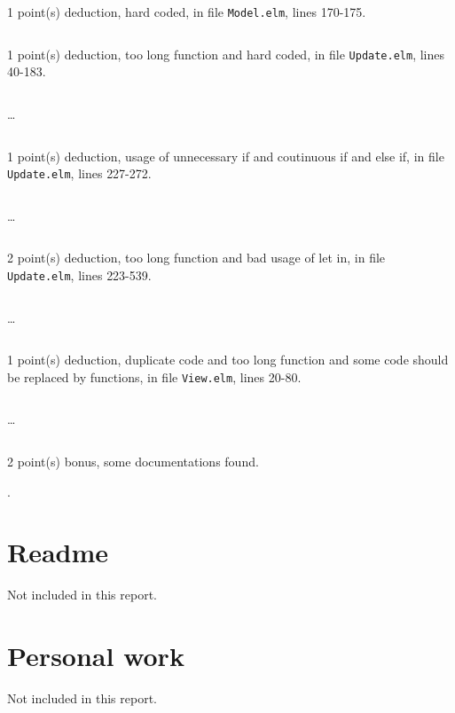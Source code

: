 \documentclass{article}
\begin{document}
1 point(s) {\color{red}deduction}, hard coded, in file {\color{blue}\texttt{Model.elm}}, lines {\color{blue}170-175}.

\inputminted[firstline=170,lastline=175]{elm}{Model.elm}

1 point(s) {\color{red}deduction}, too long function and hard coded, in file {\color{blue}\texttt{Update.elm}}, lines {\color{blue}40-183}.

\inputminted[firstline=40,lastline=49]{elm}{Update.elm}

\dots

\inputminted[firstline=174,lastline=183]{elm}{Update.elm}

1 point(s) {\color{red}deduction}, usage of unnecessary if and coutinuous if and else if, in file {\color{blue}\texttt{Update.elm}}, lines {\color{blue}227-272}.

\inputminted[firstline=227,lastline=236]{elm}{Update.elm}

\dots

\inputminted[firstline=263,lastline=272]{elm}{Update.elm}

2 point(s) {\color{red}deduction}, too long function and bad usage of let in, in file {\color{blue}\texttt{Update.elm}}, lines {\color{blue}223-539}.

\inputminted[firstline=223,lastline=232]{elm}{Update.elm}

\dots

\inputminted[firstline=530,lastline=539]{elm}{Update.elm}

1 point(s) {\color{red}deduction}, duplicate code and too long function and some code should be replaced by functions, in file {\color{blue}\texttt{View.elm}}, lines {\color{blue}20-80}.

\inputminted[firstline=20,lastline=29]{elm}{View.elm}

\dots

\inputminted[firstline=71,lastline=80]{elm}{View.elm}

2 point(s) {\color{red}bonus}, some documentations found.\medskip

.\medskip



\newpage

\section{Readme}

Not included in this report.

\section{Personal work}

Not included in this report.


\newpage
\end{document}
